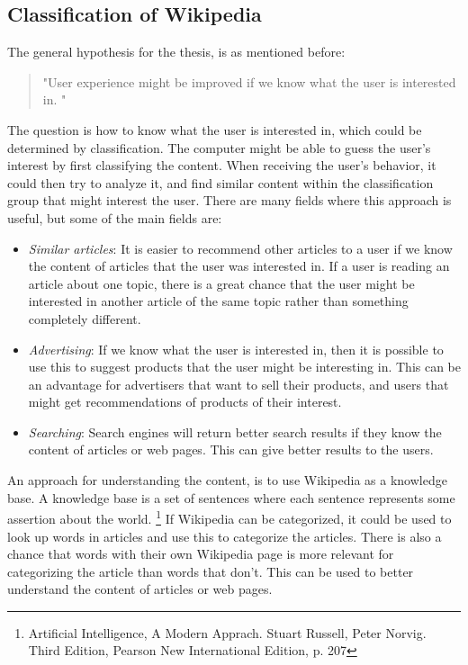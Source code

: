 \documentclass[11pt,english,a4paper]{article}
\begin{document}
\subsection*{Classification of Wikipedia}
The general hypothesis for the thesis, is as mentioned before: 
\begin{quote}
"User experience might be improved if we know what the user is interested in. "
\end{quote}
The question is how to know what the user is interested in, which could be determined by classification. The computer might be able to guess the user's interest by first classifying the content. When receiving the user's behavior, it could then try to analyze it, and find similar content within the classification group that might interest the user. There are many fields where this approach is useful, but some of the main fields are: 
\begin{itemize}
\item \textit{Similar articles}: It is easier to recommend other articles to a user if we know the content of articles that the user was interested in. If a user is reading an article about one topic, there is a great chance that the user might be  interested in another article of the same topic rather than something completely different. 
\item \textit{Advertising}: If we know what the user is interested in, then it is possible to use this to suggest products that the user might be interesting in. This can be an advantage for advertisers that want to sell their products, and users that might get recommendations of products of their interest. 
\item \textit{Searching}: Search engines will return better search results if they know the content of articles or web pages. This can give better results to the users.  
\end{itemize}

An approach for understanding the content, is to use Wikipedia as a knowledge base. A knowledge base is a set of sentences where each sentence represents some assertion about the world.%
\footnote{Artificial Intelligence, A Modern Apprach. Stuart Russell, Peter Norvig. Third Edition, Pearson New International Edition, p. 207} If Wikipedia can be categorized, it could be used to look up words in articles and use this to categorize the articles. There is also a chance that words with their own Wikipedia page is more relevant for categorizing the article than words that don't. This can be used to better understand the content of articles or web pages. 
\end{document}
